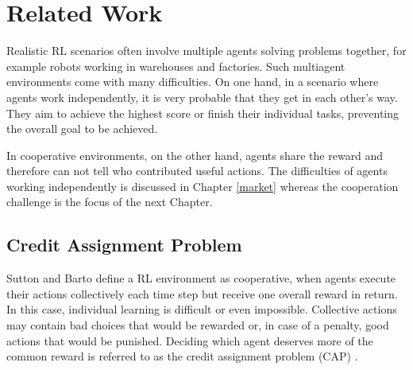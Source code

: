 %
%
\chapter{Related Work}\label{sec:RelatedWork}
Realistic RL scenarios often involve multiple agents solving problems together, for example robots working in warehouses and factories. Such multiagent environments come with many difficulties. On one hand, in a scenario where agents work independently, it is very probable that they get in each other's way. They aim to achieve the highest score or finish their individual tasks, preventing the overall goal to be achieved.

In cooperative environments, on the other hand, agents share the reward and therefore can not tell who contributed useful actions. 
The difficulties of agents working independently is discussed in Chapter \ref{market} whereas the cooperation challenge is the focus of the next Chapter.

\section{Credit Assignment Problem}\label{CAP}
Sutton and Barto \cite{suba18} define a RL environment as cooperative, when agents execute their actions collectively each time step but receive one overall reward in return. In this case, individual learning is difficult or even impossible. Collective actions may contain bad choices that would be rewarded or, in case of a penalty, good actions that would be punished. Deciding which agent deserves more of the common reward is referred to as the credit assignment problem (CAP) \cite{mi61}.

